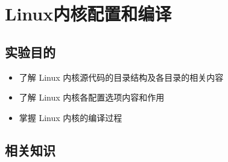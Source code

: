 \chapter{Linux内核配置和编译}

\section{实验目的}
\begin{itemize}\itemsep=-3pt
  \item 了解 Linux 内核源代码的目录结构及各目录的相关内容
  \item 了解 Linux 内核各配置选项内容和作用
  \item 掌握 Linux 内核的编译过程
\end{itemize}

\section{相关知识}
